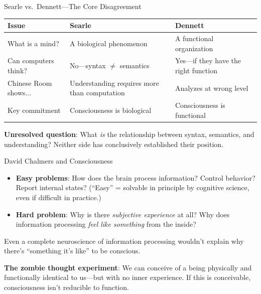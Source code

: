 \documentclass[aspectratio=169,11pt]{beamer}
\begin{document}
\begin{frame}{Searle vs.\ Dennett---The Core Disagreement}
\begin{table}[h]
\centering
\small
\begin{tabular}{@{}p{3.5cm}p{4.5cm}p{4.5cm}@{}}
\toprule
\textbf{Issue} & \textbf{Searle} & \textbf{Dennett} \\
\midrule
What is a mind? & A biological phenomenon & A functional organization \\
\addlinespace
Can computers think? & No---syntax $\neq$ semantics & Yes---if they have the right function \\
\addlinespace
Chinese Room shows... & Understanding requires more than computation & Analyzes at wrong level \\
\addlinespace
Key commitment & Consciousness is biological & Consciousness is functional \\
\bottomrule
\end{tabular}
\end{table}

\vspace{0.2em}
\textbf{Unresolved question}: What \emph{is} the relationship between syntax, semantics, and understanding? Neither side has conclusively established their position.
\end{frame}

\begin{frame}{David Chalmers and Consciousness}
\begin{conceptbox}
\small
\begin{itemize}
    \item \textbf{Easy problems}: How does the brain process information? Control behavior? Report internal states? (``Easy'' = solvable in principle by cognitive science, even if difficult in practice.)
    \item \textbf{Hard problem}: Why is there \emph{subjective experience} at all? Why does information processing \emph{feel like something} from the inside?
\end{itemize}
\end{conceptbox}

\vspace{0.3em}
Even a complete neuroscience of information processing wouldn't explain why there's ``something it's like'' to be conscious.

\vspace{0.3em}
\textbf{The zombie thought experiment}: We can conceive of a being physically and functionally identical to us---but with no inner experience. If this is conceivable, consciousness isn't reducible to function.
\end{frame}
\end{document}
